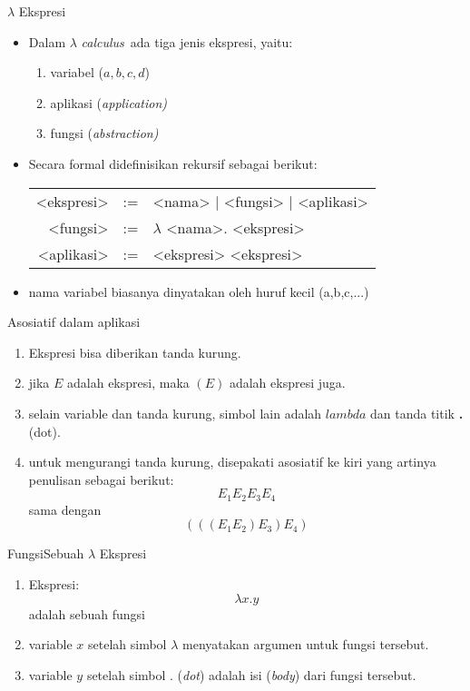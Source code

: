 \documentclass[aspectratio=1610,10pt,handout]{beamer}
\newcommand{\lc}{$\lambda$ {\it calculus}\ }
\begin{document}
\begin{frame}{$\lambda$ Ekspresi}{}

	\begin{itemize}

		\item Dalam \lc ada tiga jenis ekspresi, yaitu:
		\begin{enumerate}
			\item variabel ($a,b,c,d$)
			\item aplikasi (\it{application})
			\item fungsi (\it{abstraction})
		\end{enumerate}
		\pause
		\item Secara formal didefinisikan rekursif sebagai berikut:
		\begin{tabular}{r c l}
			<ekspresi> & := & <nama> | <fungsi> | <aplikasi> \\
			<fungsi> & := & $\lambda$ <nama>. <ekspresi> \\
			<aplikasi> & := & <ekspresi> <ekspresi>
		\end{tabular}

		\item nama variabel biasanya dinyatakan oleh huruf kecil (a,b,c,...)


	\end{itemize}
\end{frame}

\begin{frame}{Asosiatif dalam aplikasi}
	\begin{enumerate}
	\item Ekspresi bisa diberikan tanda kurung.
	\item jika $E$ adalah ekspresi, maka $(E)$ adalah ekspresi juga.
	\item selain variable dan tanda kurung, simbol lain adalah $lambda$ dan tanda titik {\bf .} (dot).
	\item untuk mengurangi tanda kurung, disepakati asosiatif ke kiri yang artinya penulisan sebagai berikut:
	$$E_1 E_2 E_3 E_4$$
	sama dengan
	$$ (((E_1 E_2) E_3) E_4) $$
	\end{enumerate}

\end{frame}

\begin{frame}{Fungsi}{Sebuah $\lambda$ Ekspresi}

	\begin{enumerate}
		\item<1-> Ekspresi: $$\lambda x. y$$ adalah sebuah fungsi
		\item<2-> variable $x$ setelah simbol $\lambda$ menyatakan argumen untuk fungsi tersebut.
		\item<3-> variable $y$ setelah simbol . ({\it dot}) adalah isi ({\it body}) dari fungsi tersebut.
	\end{enumerate}
\end{frame}
\end{document}
